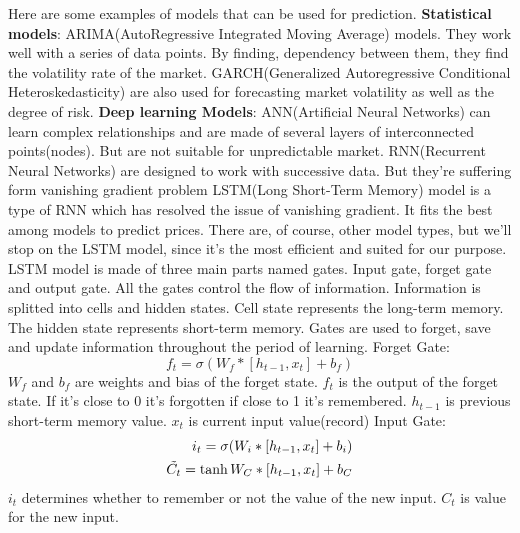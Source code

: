 \documentclass[10pt,twoside,english,a4paper]{article}
\begin{document}
Here are some examples of models that can be used for prediction.
\newline\textbf{Statistical models}:
\newline ARIMA(AutoRegressive Integrated Moving Average) models. They work well with a series of data points. By finding, dependency between them, they find the volatility rate of the market.
\newline GARCH(Generalized Autoregressive Conditional Heteroskedasticity) are also used for forecasting market volatility as well as the degree of risk.
\newline
\textbf{Deep learning Models}:
\newline ANN(Artificial Neural Networks) can learn complex relationships and are made of several layers of interconnected points(nodes). But are not suitable for unpredictable market.
\newline RNN(Recurrent Neural Networks) are designed to work with successive data. But they're suffering form vanishing gradient problem
\newline LSTM(Long Short-Term Memory) model is a type of RNN which has resolved the issue of vanishing gradient. It fits the best among models to predict prices.
\newline There are, of course, other model types, but we'll stop on the LSTM model, since it's the most efficient and suited for our purpose. 
\newline
\newline LSTM model is made of three main parts named gates. Input gate, forget gate and output gate. All the gates control the flow of information. Information is splitted into cells and hidden states. Cell state represents the long-term memory. The hidden state represents short-term memory. Gates are used to forget, save and update information throughout the period of learning. 
\newline Forget Gate: 
\[f_{t} = \sigma (W_{f}*[h_{t-1}, x_{t}] + b_{f})\]
$W_{f}$ and $b_{f}$ are weights and bias of the forget state. $f_{t}$ is the output of the forget state. If it's close to 0 it's forgotten if close to 1 it's remembered. $h_{t-1}$ is previous short-term memory value. $x_t$ is current input value(record)
\newline Input Gate:
\begin{align*}
    i_{t} = \sigma(W_{i} * [h_{t-1}, x_{t}] + b_{i}) \\
    \Tilde{C_{t}} = \tanh{W_{C}*[h_{t-1}, x_{t}] + b_{C}}
\end{align*}
$i_t$ determines whether to remember or not the value of the new input. $C_t$ is value for the new input.
\end{document}
